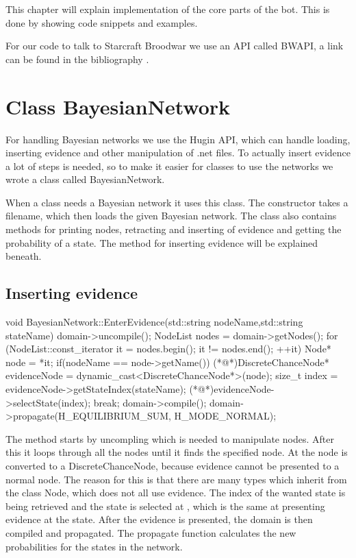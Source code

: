 This chapter will explain implementation of the core parts of the bot. This is done by showing code snippets and examples.

For our code to talk to Starcraft Broodwar we use an API called BWAPI, a link can be found in the bibliography \cite{bwapi}.


\section{Class BayesianNetwork}
	For handling Bayesian networks we use the Hugin API, which can handle loading, inserting evidence and other manipulation of .net files. To actually 
	insert evidence a lot of steps is needed, so to make it easier for classes to use the networks we wrote a class called BayesianNetwork.

	When a class needs a Bayesian network it uses this class. The constructor takes a filename, which then loads the given 
	Bayesian network. The class also contains methods for printing nodes, retracting and inserting of evidence and getting the probability of a state. 
	The method for inserting evidence will be explained beneath.
	\subsection*{Inserting evidence}
		\begin{Sourcecode}[caption=EnterEvidence method]
void BayesianNetwork::EnterEvidence(std::string nodeName,std::string stateName)
{
domain->uncompile();
NodeList nodes = domain->getNodes();
for (NodeList::const_iterator it = nodes.begin(); it != nodes.end(); ++it)
{
	Node* node = *it;
	if(nodeName == node->getName())
	{
		(*@\lnote@*)DiscreteChanceNode* evidenceNode = dynamic_cast<DiscreteChanceNode*>(node);
		size_t index = evidenceNode->getStateIndex(stateName);
		(*@\lnote@*)evidenceNode->selectState(index);
		break;
	}
}
domain->compile();
domain->propagate(H_EQUILIBRIUM_SUM, H_MODE_NORMAL);
}
		\end{Sourcecode}
		The method starts by uncompling which is needed to manipulate nodes. After this it loops through all the nodes until it finds the specified 
		node. At  the node is converted to a DiscreteChanceNode, because evidence cannot be presented to a normal node. The reason for this 
		is that there are many types which inherit from the class Node, which does not all use evidence. The index of the wanted state is being 
		retrieved and the state is selected at , which is the same at presenting evidence at the state. After the evidence is presented, the 
		domain is then compiled and propagated. The propagate function calculates the new probabilities for the states in the network.